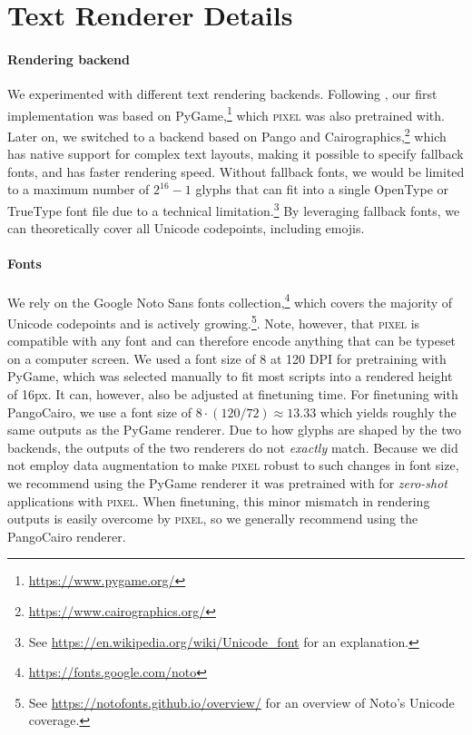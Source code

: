 \documentclass{article}
\newcommand{\model}{\textsc{pixel}\xspace}
\begin{document}
\section{Text Renderer Details}
\label{app:text_renderer}

\paragraph{Rendering backend} We experimented with different text rendering backends. Following \citet{salesky-etal-2021-robust}, our first implementation was based on PyGame,\footnote{\url{https://www.pygame.org/}} which \model was also pretrained with. Later on, we switched to a backend based on Pango \citep{taylor-2004-pango} and Cairographics,\footnote{\url{https://www.cairographics.org/}} which has native support for complex text layouts, making it possible to specify fallback fonts, and has faster rendering speed. Without fallback fonts, we would be limited to a maximum number of $2^{16} - 1$ glyphs that can fit into a single OpenType or TrueType font file due to a technical limitation.\footnote{See \url{https://en.wikipedia.org/wiki/Unicode_font} for an explanation.} By leveraging fallback fonts, we can theoretically cover all Unicode codepoints, including emojis. 

\paragraph{Fonts} We rely on the Google Noto Sans fonts collection,\footnote{\url{https://fonts.google.com/noto}} which covers the majority of Unicode codepoints and is actively growing.\footnote{See \url{https://notofonts.github.io/overview/} for an overview of Noto's Unicode coverage.}. Note, however, that \model is compatible with any font and can therefore encode anything that can be typeset on a computer screen. We used a font size of 8 at 120 DPI for pretraining with PyGame, which was selected manually to fit most scripts into a rendered height of 16px. It can, however, also be adjusted at finetuning time. For finetuning with PangoCairo, we use a font size of $8 \cdot (120/72) \approx 13.33$ which yields roughly the same outputs as the PyGame renderer. Due to how glyphs are shaped by the two backends, the outputs of the two renderers do not \emph{exactly} match. Because we did not employ data augmentation to make \model robust to such changes in font size,  we recommend using the PyGame renderer it was pretrained with for \emph{zero-shot} applications with \model. When finetuning, this minor mismatch in rendering outputs is easily overcome by \model, so we generally recommend using the PangoCairo renderer.
\end{document}
